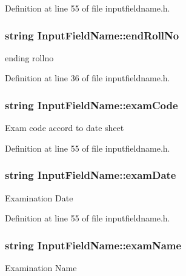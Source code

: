 Definition at line 55 of file inputfieldname.\-h.

\hypertarget{classInputFieldName_a06435f9ba5a529cbba4ee1ce9b02e5cc}{
\subsubsection[{end\-Roll\-No}]{\setlength{\rightskip}{0pt plus 5cm}string Input\-Field\-Name\-::end\-Roll\-No}}\label{classInputFieldName_a06435f9ba5a529cbba4ee1ce9b02e5cc}
ending rollno 

Definition at line 36 of file inputfieldname.\-h.

\hypertarget{classInputFieldName_a3cc09a852d20e96bb4908b9f66c01ed7}{
\subsubsection[{exam\-Code}]{\setlength{\rightskip}{0pt plus 5cm}string Input\-Field\-Name\-::exam\-Code}}\label{classInputFieldName_a3cc09a852d20e96bb4908b9f66c01ed7}
Exam code accord to date sheet 

Definition at line 55 of file inputfieldname.\-h.

\hypertarget{classInputFieldName_a4e60d793497c36b2d80e2411cbb915d8}{
\subsubsection[{exam\-Date}]{\setlength{\rightskip}{0pt plus 5cm}string Input\-Field\-Name\-::exam\-Date}}\label{classInputFieldName_a4e60d793497c36b2d80e2411cbb915d8}
Examination Date 

Definition at line 55 of file inputfieldname.\-h.

\hypertarget{classInputFieldName_a4cee41667cdc0e38f8f76af94ef39c36}{
\subsubsection[{exam\-Name}]{\setlength{\rightskip}{0pt plus 5cm}string Input\-Field\-Name\-::exam\-Name}}\label{classInputFieldName_a4cee41667cdc0e38f8f76af94ef39c36}
Examination Name 

